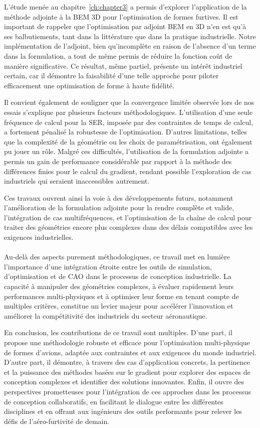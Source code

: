 L'étude menée au chapitre~\ref{ch:chapter3} a permis d'explorer l'application de la méthode adjointe à la BEM 3D pour l'optimisation de formes furtives. Il est important de rappeler que l'optimisation par adjoint BEM en 3D n'en est qu'à ses balbutiements, tant dans la littérature que dans la pratique industrielle. Notre implémentation de l'adjoint, bien qu'incomplète en raison de l'absence d'un terme dans la formulation, a tout de même permis de réduire la fonction coût de manière significative. Ce résultat, même partiel, présente un intérêt industriel certain, car il démontre la faisabilité d'une telle approche pour piloter efficacement une optimisation de forme à haute fidélité.

Il convient également de souligner que la convergence limitée observée lors de nos essais s'explique par plusieurs facteurs méthodologiques. L'utilisation d'une seule fréquence de calcul pour la SER, imposée par des contraintes de temps de calcul, a fortement pénalisé la robustesse de l'optimisation. D'autres limitations, telles que la complexité de la géométrie ou les choix de paramétrisation, ont également pu jouer un rôle. Malgré ces difficultés, l'utilisation de la formulation adjointe a permis un gain de performance considérable par rapport à la méthode des différences finies pour le calcul du gradient, rendant possible l'exploration de cas industriels qui seraient inaccessibles autrement.

Ces travaux ouvrent ainsi la voie à des développements futurs, notamment l'amélioration de la formulation adjointe pour la rendre complète et valide, l'intégration de cas multifréquences, et l'optimisation de la chaîne de calcul pour traiter des géométries encore plus complexes dans des délais compatibles avec les exigences industrielles.

\paragraph{}
Au-delà des aspects purement méthodologiques, ce travail met en lumière l'importance d'une intégration étroite entre les outils de simulation, d'optimisation et de CAO dans le processus de conception industrielle. La capacité à manipuler des géométries complexes, à évaluer rapidement leurs performances multi-physiques et à optimiser leur forme en tenant compte de multiples critères, constitue un levier majeur pour accélérer l'innovation et améliorer la compétitivité des industriels du secteur aéronautique.

En conclusion, les contributions de ce travail sont multiples. D'une part, il propose une méthodologie robuste et efficace pour l'optimisation multi-physique de formes d'avions, adaptée aux contraintes et aux exigences du monde industriel. D'autre part, il démontre, à travers des cas d'application concrets, la pertinence et la puissance des méthodes basées sur le gradient pour explorer des espaces de conception complexes et identifier des solutions innovantes. Enfin, il ouvre des perspectives prometteuses pour l'intégration de ces approches dans les processus de conception collaboratifs, en facilitant le dialogue entre les différentes disciplines et en offrant aux ingénieurs des outils performants pour relever les défis de l'aéro-furtivité de demain.


